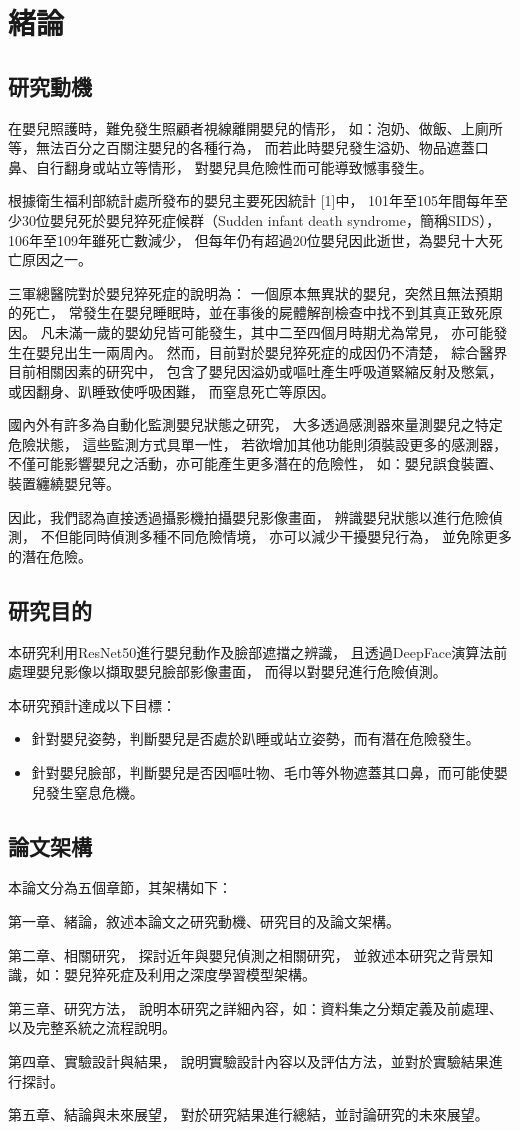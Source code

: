 \documentclass[class=NCU_thesis, crop=false]{standalone}
\begin{document}
\chapter{緒論}
\section{研究動機}
在嬰兒照護時，難免發生照顧者視線離開嬰兒的情形，
如：泡奶、做飯、上廁所等，無法百分之百關注嬰兒的各種行為，
而若此時嬰兒發生溢奶、物品遮蓋口鼻、自行翻身或站立等情形，
對嬰兒具危險性而可能導致憾事發生。

根據衛生福利部統計處所發布的嬰兒主要死因統計 [1]中，
101年至105年間每年至少30位嬰兒死於嬰兒猝死症候群（Sudden infant death syndrome，簡稱SIDS），
106年至109年雖死亡數減少，
但每年仍有超過20位嬰兒因此逝世，為嬰兒十大死亡原因之一。

三軍總醫院對於嬰兒猝死症的說明為：
一個原本無異狀的嬰兒，突然且無法預期的死亡，
常發生在嬰兒睡眠時，並在事後的屍體解剖檢查中找不到其真正致死原因。
凡未滿一歲的嬰幼兒皆可能發生，其中二至四個月時期尤為常見，
亦可能發生在嬰兒出生一兩周內。
然而，目前對於嬰兒猝死症的成因仍不清楚，
綜合醫界目前相關因素的研究中，
包含了嬰兒因溢奶或嘔吐產生呼吸道緊縮反射及憋氣，
或因翻身、趴睡致使呼吸困難，
而窒息死亡等原因。

國內外有許多為自動化監測嬰兒狀態之研究，
大多透過感測器來量測嬰兒之特定危險狀態，
這些監測方式具單一性，
若欲增加其他功能則須裝設更多的感測器，
不僅可能影響嬰兒之活動，亦可能產生更多潛在的危險性，
如：嬰兒誤食裝置、裝置纏繞嬰兒等。

因此，我們認為直接透過攝影機拍攝嬰兒影像畫面，
辨識嬰兒狀態以進行危險偵測，
不但能同時偵測多種不同危險情境，
亦可以減少干擾嬰兒行為，
並免除更多的潛在危險。


\section{研究目的}
本研究利用ResNet50進行嬰兒動作及臉部遮擋之辨識，
且透過DeepFace演算法前處理嬰兒影像以擷取嬰兒臉部影像畫面，
而得以對嬰兒進行危險偵測。

本研究預計達成以下目標：
\begin{itemize}
    \item 針對嬰兒姿勢，判斷嬰兒是否處於趴睡或站立姿勢，而有潛在危險發生。
    \item 針對嬰兒臉部，判斷嬰兒是否因嘔吐物、毛巾等外物遮蓋其口鼻，而可能使嬰兒發生窒息危機。
\end{itemize}

\section{論文架構}
本論文分為五個章節，其架構如下：

第一章、緒論，敘述本論文之研究動機、研究目的及論文架構。

第二章、相關研究，
探討近年與嬰兒偵測之相關研究，
並敘述本研究之背景知識，如：嬰兒猝死症及利用之深度學習模型架構。

第三章、研究方法，
說明本研究之詳細內容，如：資料集之分類定義及前處理、以及完整系統之流程說明。

第四章、實驗設計與結果，
說明實驗設計內容以及評估方法，並對於實驗結果進行探討。

第五章、結論與未來展望，
對於研究結果進行總結，並討論研究的未來展望。
\end{document}
